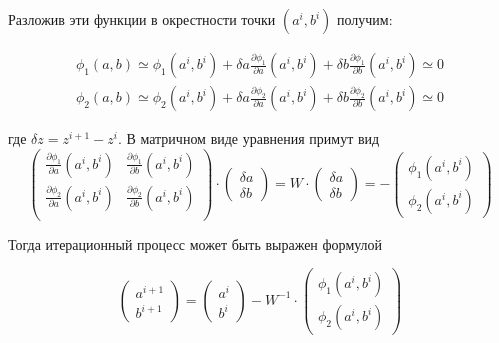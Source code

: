 \documentclass[a4paper,12pt]{article}
\begin{document}
Разложив эти функции в окрестности точки \((a^i, b^i)\) получим:

\begin{gather*}
  \phi_1(a,b)\simeq\phi_1(a^i,b^i)+\delta a\frac{\partial \phi_1}{\partial a}(a^i,b^i)+\delta b\frac{\partial \phi_1}{\partial b}(a^i,b^i)\simeq0\\ \phi_2(a,b)\simeq\phi_2(a^i,b^i)+\delta a\frac{\partial \phi_2}{\partial a}(a^i,b^i)+\delta b\frac{\partial \phi_2}{\partial b}(a^i,b^i)\simeq0
\end{gather*}

где \(\delta z=z^{i+1}-z^{i}\). В матричном виде уравнения примут вид
\begin{equation*}
  \begin{pmatrix}
    \frac{\partial \phi_1}{\partial a}(a^i,b^i) & \frac{\partial \phi_1}{\partial b}(a^i,b^i) \\
    \frac{\partial \phi_2}{\partial a}(a^i,b^i) & \frac{\partial \phi_2}{\partial b}(a^i,b^i) \\
  \end{pmatrix} \cdot
  \begin{pmatrix}
    \delta a \\
    \delta b
  \end{pmatrix} =W\cdot
  \begin{pmatrix}
    \delta a \\
    \delta b
  \end{pmatrix} = -
  \begin{pmatrix}
    \phi_1(a^i,b^i) \\
    \phi_2(a^i,b^i)
  \end{pmatrix}
\end{equation*}

Тогда итерационный процесс может быть выражен формулой

\begin{equation*}
  \begin{pmatrix}
    a^{i+1} \\
    b^{i+1}
  \end{pmatrix}=
  \begin{pmatrix}
    a^{i} \\
    b^{i}
  \end{pmatrix}-W^{-1}\cdot
  \begin{pmatrix}
    \phi_1(a^i,b^i) \\
    \phi_2(a^i,b^i)
  \end{pmatrix}
\end{equation*}
\end{document}
